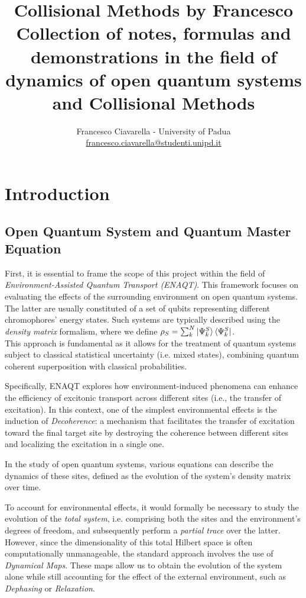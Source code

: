 \documentclass[a4paper,12pt]{article}
\title{
\vspace{2cm}
\Huge \textbf{Collisional Methods by Francesco} \\[0.5cm]
\large Collection of notes, formulas and demonstrations in the field of dynamics of open quantum systems and Collisional Methods
\vspace{5cm}
}
\author{\Large Francesco Ciavarella - University of Padua \\[10pt] \href{mailto:francesco.ciavarella@studenti.unipd.it}{francesco.ciavarella@studenti.unipd.it}}
\begin{document}
	\maketitle
	\thispagestyle{empty}
	\newpage

	\tableofcontents
	\newpage

	\section{Introduction}
	\label{sec:intro}

	\subsection{Open Quantum System and Quantum Master Equation}
	\label{sub:open_quantum_sys_QME}
	First, it is essential to frame the scope of this project within the field of \textit{Environment-Assisted Quantum Transport (ENAQT)}. This framework focuses on evaluating the effects of the surrounding environment on open quantum systems. The latter are usually constituted of a set of qubits representing different chromophores' energy states.
	Such systems are typically described using the \textit{density matrix} formalism, where we define $ \rho_S = \sum_{k}^{N}{\ket{\Psi_{k}^{S}}\bra{\Psi_{k}^{S}}} $.\\
	This approach is fundamental as it allows for the treatment of quantum systems subject to classical statistical uncertainty (i.e. mixed states), combining quantum coherent superposition with classical probabilities.

	Specifically, ENAQT explores how environment-induced phenomena can enhance the efficiency of excitonic transport across different sites (i.e., the transfer of excitation). In this context, one of the simplest environmental effects is the induction of \textit{Decoherence}: a mechanism that facilitates the transfer of excitation toward the final target site by destroying the coherence between different sites and localizing the excitation in a single one.

	In the study of open quantum systems, various equations can describe the dynamics of these sites, defined as the evolution of the system's density matrix over time.

	To account for environmental effects, it would formally be necessary to study the evolution of the \textit{total system}, i.e. comprising both the sites and the environment's degrees of freedom, and subsequently perform a \textit{partial trace} over the latter. However, since the dimensionality of this total Hilbert space is often computationally unmanageable, the standard approach involves the use of \textit{Dynamical Maps}. These maps allow us to obtain the evolution of the system alone while still accounting for the effect of the external environment, such as \textit{Dephasing} or \textit{Relaxation}.
\end{document}
